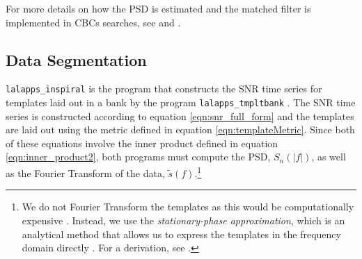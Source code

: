 For more details on how the \ac{PSD} is estimated and the matched filter is
implemented in \acp{CBC} searches, see \cite{Brown} and \cite{Allen:2005fk}.

\subsection{Data Segmentation}
\label{sec:data_segmentation}

\texttt{lalapps\_inspiral} is the program that constructs the \ac{SNR} time
series for templates laid out in a bank by the program
\texttt{lalapps\_tmpltbank} \cite{brown-2005-22}. The \ac{SNR} time series is
constructed according to equation \ref{eqn:snr_full_form} and the templates are
laid out using the metric defined in equation \ref{eqn:templateMetric}. Since
both of these equations involve the inner product defined in equation
\ref{eqn:inner_product2}, both programs must compute the \ac{PSD},
$S_n(|f|)$, as well as the Fourier Transform of the data,
$\widetilde{s}(f)$.\footnote{We do not Fourier Transform the templates as this
would be computationally expensive \cite{Brown}. Instead, we use the
\emph{stationary-phase approximation}, which is an analytical method that allows
us to express the templates in the frequency domain directly
\cite{WillWiseman:1996, Cutler:1994}. For a derivation, see \cite{Brown}.}

